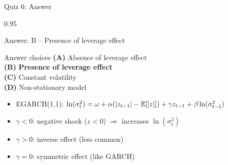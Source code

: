 \documentclass[9pt, aspectratio=169, t]{beamer}
\begin{document}
\begin{frame}{Quiz 6: Answer}
    \begin{cminipage}{0.95\textwidth}
    {\small
    \begin{exampleblock}{Answer: B -- Presence of leverage effect}

    \vspace{0.1cm}

    \begin{block}{Answer choices}
        \textcolor{MainBlue}{\textbf{(A)}} Absence of leverage effect \incorrect\\[2pt]
        \textcolor{MainBlue}{\textbf{(B)}} \textbf{\textcolor{Forest}{Presence of leverage effect}} \correct\\[2pt]
        \textcolor{MainBlue}{\textbf{(C)}} Constant volatility \incorrect\\[2pt]
        \textcolor{MainBlue}{\textbf{(D)}} Non-stationary model \incorrect
    \end{block}

        \vspace{0.1cm}

        \begin{itemize}\setlength{\itemsep}{0pt}
            \item EGARCH(1,1): $\ln(\sigma_t^2) = \omega + \alpha (|z_{t-1}| - \mathbb{E}[|z|]) + \gamma z_{t-1} + \beta \ln(\sigma_{t-1}^2)$
            \item $\gamma < 0$: negative shock ($z < 0$) $\Rightarrow$ increases $\ln(\sigma_t^2)$
            \item $\gamma > 0$: inverse effect (less common)
            \item $\gamma = 0$: symmetric effect (like GARCH)
        \end{itemize}
    \end{exampleblock}
    }

    \end{cminipage}
\end{frame}
\end{document}
